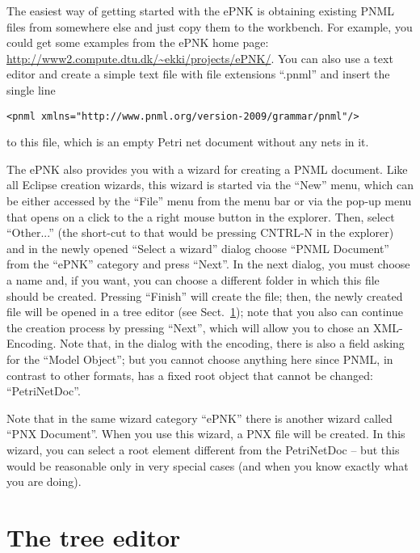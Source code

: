 The easiest way of getting started with the ePNK is obtaining existing PNML
files from somewhere else and just copy them to the workbench. For example, you
could get some examples from the ePNK home page: 
\url{http://www2.compute.dtu.dk/~ekki/projects/ePNK/}. You can also use a text
editor and create a simple text file with file extensions ``.pnml'' and insert
the single line
\begin{lstlisting}[language={[structured]PNML},keywordstyle=\underbar]
  <pnml xmlns="http://www.pnml.org/version-2009/grammar/pnml"/>
\end{lstlisting}
to this file, which is an empty Petri net document without any nets in it.

The ePNK also provides you with a wizard for creating a PNML document.
Like all Eclipse creation wizards, this wizard is started via the ``New''
menu, which can be either accessed by the ``File'' menu from the menu bar or via
the pop-up menu that opens on a click to the a right mouse button in the
explorer.
Then, select ``Other...'' (the short-cut to that would be pressing
CNTRL-N in the explorer) and in the newly opened ``Select a wizard''
dialog choose ``PNML Document''%
from the ``ePNK'' category and press
``Next''. In the next dialog, you must choose a name and, if you
want, you can choose a different folder in which this file should
be created. Pressing ``Finish'' will create the file; then, the
newly created file will be opened in a tree editor (see
Sect.~\ref{sec:tree-editor});%
note that you also can continue the
creation process by pressing ``Next'', which will allow you to chose an
XML-Encoding.  Note that, in the dialog with the encoding, there
is also a field asking for the ``Model Object''; but you cannot
choose anything here since PNML, in contrast to other formats,
has a fixed root object that cannot be changed: ``PetriNetDoc''. 

Note that in the same wizard category ``ePNK'' there is another
wizard called ``PNX Document''.%
When you use this wizard, a PNX file
will be created. In this wizard, you can select a root element different
from the PetriNetDoc -- but this would be reasonable only in very special cases
(and when you know exactly what you are doing).
 
\section{The tree editor}
\label{sec:tree-editor}

